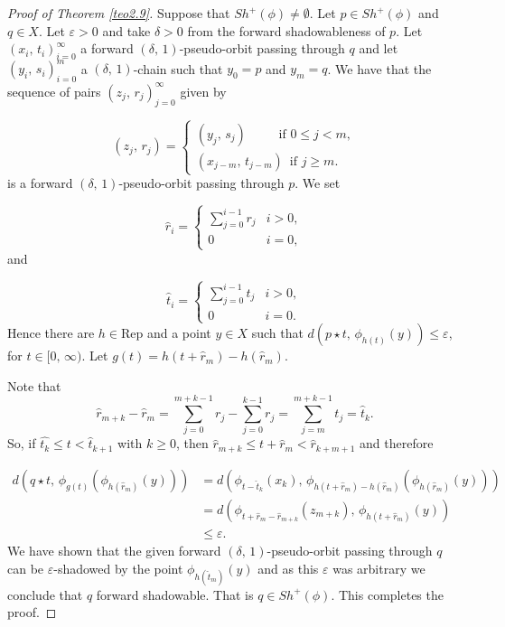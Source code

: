 \documentclass{amsart}
\theoremstyle{definition}
\newcommand{\ep}{\varepsilon}
\begin{document}
\begin{proof}[Proof of Theorem \ref{teo2.9}]
Suppose that $Sh^+(\phi)\neq\emptyset$. Let $p\in Sh^+(\phi)$ and $q\in X$. Let $\ep > 0$ and take $\delta > 0$ from the forward shadowableness of $p$. Let $(x_i,\, t_i)_{i=0}^{\infty}$ a  forward $(\delta,\,1)$-pseudo-orbit passing through $q$ and let $(y_i,\,s_i)_{i=0}^m$ a $(\delta,\,1)$-chain such that $y_0 = p$ and $y_m= q$. We have that the sequence of pairs $(z_j,\,r_j)_{j=0}^{\infty}$ given by 

\[
  (z_j,\,r_j) =
 \begin{cases} (y_j,\,s_j)\quad \quad \ \mbox{ if } 0\leq j< m,\\
               (x_{j - m},\, t_{j - m})\, \mbox{ if }  j\geq m.
  \end{cases}
\] 
is a forward $(\delta,\,1)$-pseudo-orbit passing through $p$. We set 
 
   \[\hat{r}_i =
      \begin{cases}
        \displaystyle{\sum_{j=0}^{i-1}} r_j & i > 0,\\
		    0				             & i = 0,
      \end{cases}
    \]
and
    
    \[\hat{t}_i =
      \begin{cases}
        \displaystyle{\sum_{j=0}^{i-1}} t_j & i > 0,\\
		    0				             & i = 0.
      \end{cases}
    \]
Hence there are $h\in \mathrm{Rep}$ and a point $y\in X$ such that $d(p\star t,\,\phi_{h(t)}(y))\leq\ep$, for $t\in[0,\,\infty)$. Let $g(t) = h(t + \hat{r}_m) - h(\hat{r}_m)$.  

Note that 
$$\hat{r}_{m + k} - \hat{r}_m = \sum_{j = 0}^{m + k -1}r_j-\sum_{j=0}^{k-1}r_j = \sum_{j=m}^{m+k-1}t_j = \hat{t}_k.$$
So, if $\hat{t_k}\leq t < \hat{t}_{k+1}$ with $k\geq 0$, then $\hat{r}_{m+k}\leq t + \hat{r}_m < \hat{r}_{k + m +1}$ and therefore

\begin{align*}
d(q\star t,\, \phi_{g(t)}(\phi_{h(\hat{r}_m)}(y)))&=d(\phi_{t-\hat{t}_k}(x_k),\,\phi_{h(t+\hat{r}_m) - h(\hat{r}_m)}(\phi_{h(\hat{r}_m)}(y)))\\
&= d(\phi_{t + \hat{r}_{m}-\hat{r}_{m+k}}(z_{m+k}),\,\phi_{h(t+\hat{r}_m)}(y))\\
&\leq\ep.
\end{align*}
We have shown that the given forward $(\delta,\,1)$-pseudo-orbit passing through $q$ can be $\ep$-shadowed by the point $\phi_{h(\hat{t}_m)}(y)$ and as this $\ep$ was arbitrary we conclude that $q$ forward shadowable. That is $q\in Sh^+(\phi)$. This completes the proof.
\end{proof}
\end{document}
